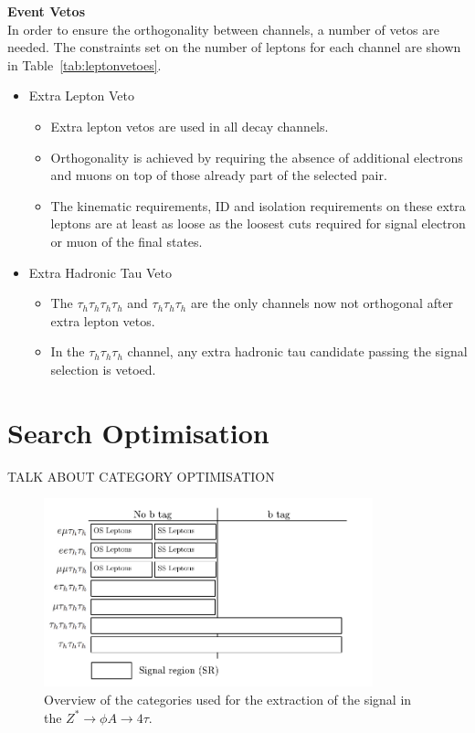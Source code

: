 \textbf{Event Vetos}~\\
In order to ensure the orthogonality between channels, a number of vetos are needed. The constraints set on the number of leptons for each channel are shown in Table~\ref{tab:leptonvetoes}.

\begin{itemize}
  \item Extra Lepton Veto
  \begin{itemize}
    \item Extra lepton vetos are used in all decay channels.
    \item Orthogonality is achieved by requiring the absence of additional electrons and muons on top of those already part of the selected pair.
    \item The kinematic requirements, ID and isolation requirements on these extra leptons are at least as loose as the loosest cuts required for signal electron or muon of the final states.
  \end{itemize}
  \item Extra Hadronic Tau Veto
  \begin{itemize}
    \item The $\tau_h \tau_h \tau_h \tau_h$ and $\tau_h \tau_h \tau_h$ are the only channels now not orthogonal after extra lepton vetos.
    \item In the $\tau_h \tau_h \tau_h$ channel, any extra hadronic tau candidate passing the signal selection is vetoed.
  \end{itemize}
\end{itemize}


\section{Search Optimisation}

TALK ABOUT CATEGORY OPTIMISATION \\

\begin{figure}[!hbtp]
\centering
    \includegraphics[width=0.85\textwidth]{Figures/event-categories_4tau.pdf}
\caption{Overview of the categories used for the extraction of the signal in the $Z^{*}\rightarrow \phi A \rightarrow 4\tau$.}
\label{fig:high_mass_categories}
\end{figure}

